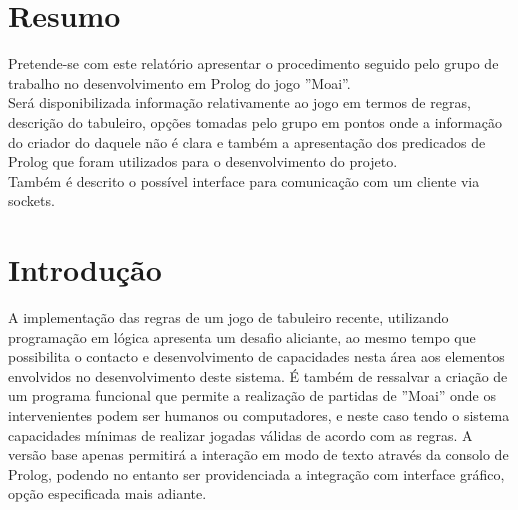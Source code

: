 \documentclass[15pt,a4paper]{article}
\begin{document}
\newpage

\section*{Resumo}
Pretende-se com este relatório apresentar o procedimento seguido pelo grupo de trabalho no desenvolvimento em Prolog do jogo ''Moai''.
\\
Será disponibilizada informação relativamente ao jogo em termos de regras, descrição do tabuleiro, opções tomadas pelo grupo em pontos onde a informação do criador do daquele não é clara e também a apresentação dos predicados de Prolog que foram utilizados para o desenvolvimento do projeto.
\\Também é descrito o possível interface para comunicação com um cliente via sockets.

\newpage

\tableofcontents



\newpage

\section{Introdução}
A implementação das regras de um jogo de tabuleiro recente, utilizando programação em lógica apresenta um desafio aliciante, ao mesmo tempo que possibilita o contacto e desenvolvimento de capacidades nesta área aos elementos envolvidos no desenvolvimento deste sistema. É também de ressalvar a criação de um programa funcional que permite a realização de partidas de ''Moai'' onde os intervenientes podem ser humanos ou computadores, e neste caso tendo o sistema capacidades mínimas de realizar jogadas válidas de acordo com as regras. A versão base apenas permitirá a interação em modo de texto através da consolo de Prolog, podendo no entanto ser providenciada a integração com interface gráfico, opção especificada mais adiante.

\end{document}
